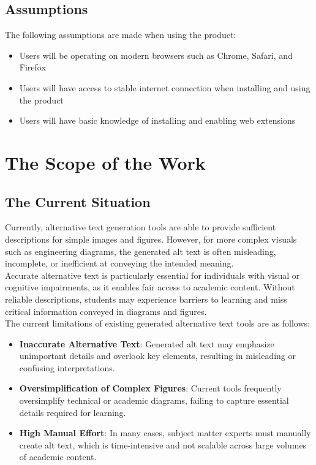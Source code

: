 \documentclass[12pt]{article}
\begin{document}
\subsection{Assumptions}
The following assumptions are made when using the product:
\begin{itemize}
  \item Users will be operating on modern browsers such as Chrome, Safari, and Firefox
  \item Users will have access to stable internet connection when installing and using the product
  \item Users will have basic knowledge of installing and enabling web extensions
\end{itemize}
\section{The Scope of the Work}
\subsection{The Current Situation}
Currently, alternative text generation tools are able to provide sufficient descriptions for simple images and figures. However, for more complex visuals 
such as engineering diagrams, the generated alt text is often misleading, incomplete, or inefficient at conveying the intended meaning.\\
Accurate alternative text is particularly essential for individuals with visual or cognitive impairments, as it enables fair access to academic content. Without 
reliable descriptions, students may experience barriers to learning and miss critical information conveyed in diagrams and figures.\\
The current limitations of existing generated alternative text tools are as follows:
\begin{itemize}
  \item \textbf{Inaccurate Alternative Text}: Generated alt text may emphasize unimportant details and overlook key elements, 
  resulting in misleading or confusing interpretations.
  \item \textbf{Oversimplification of Complex Figures}: Current tools frequently oversimplify technical or academic diagrams, 
  failing to capture essential details required for learning.
  \item \textbf{High Manual Effort}: In many cases, subject matter experts must manually create alt text, 
  which is time-intensive and not scalable across large volumes of academic content.
\end{itemize}
\end{document}
